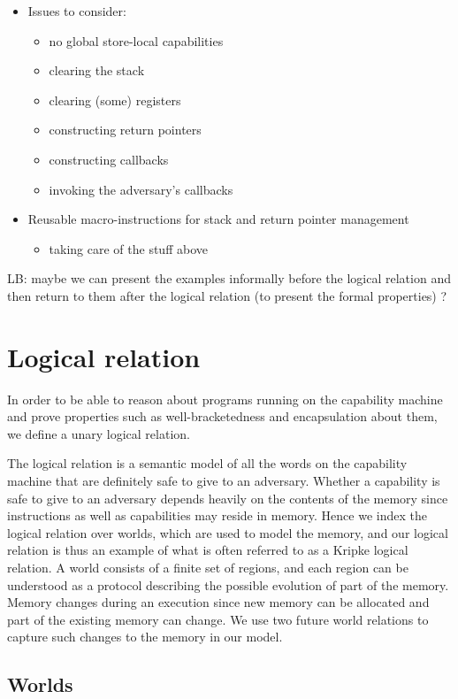 \documentclass[compsoc,conference,letterpaper,fleqn]{IEEEtran}
\begin{document}
\begin{itemize}
\item Issues to consider:
\begin{itemize}
\item no global store-local capabilities
\item clearing the stack
\item clearing (some) registers
\item constructing return pointers
\item constructing callbacks
\item invoking the adversary's callbacks
\end{itemize}
\item Reusable macro-instructions for stack and return pointer management
\begin{itemize}
\item taking care of the stuff above
\end{itemize}
\end{itemize}

LB: maybe we can present the examples informally before the logical relation and then return to them after the logical relation (to present the formal properties) ?

\section{Logical relation}
In order to be able to reason about programs running on the capability
machine and prove properties such as well-bracketedness and
encapsulation about them, we define a unary logical relation.

The logical relation is a semantic model of all the words on the
capability machine that are definitely safe to give to an
adversary. Whether a capability is safe to give to an adversary
depends heavily on the contents of the memory since instructions as well
as capabilities may reside in memory. Hence we index the logical
relation over worlds, which are used to model the memory, and our logical
relation is thus an example of what is often referred to as a Kripke
logical relation. A world consists of a finite set of regions, and each region
can be understood as a protocol describing the possible evolution of
part of the memory. Memory changes during an
execution since new memory can be allocated and part of the existing
memory can change. We use two future world relations to capture
such changes to the memory in our model.
%

\subsection{Worlds}
\end{document}
